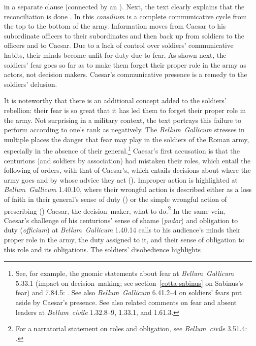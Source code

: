 \documentclass[12pt,letterpaper,oneside,final]{memoir}
\begin{document}
in a separate clause (connected by an ). Next, the text clearly explains that the reconciliation is done . In this \emph{consilium} is a complete communicative cycle from the top to the bottom of the army. Information moves from Caesar to his subordinate officers to their subordinates and then back up from soldiers to the officers and to Caesar. Due to a lack of control over soldiers' communicative habits, their minds become unfit for duty due to fear. As shown next, the soldiers' fear goes so far as to make them forget their proper role in the army as actors, not decision makers. Caesar's communicative presence is a remedy to the soldiers' delusion.

It is noteworthy that there is an additional concept added to the soldiers' rebellion: their fear is so great that it has led them to forget their proper role in the army. Not surprising in a military context, the text portrays this failure to perform according to one's rank as negatively. The \emph{Bellum~Gallicum} stresses in multiple places the danger that fear may play in the soldiers of the Roman army, especially in the absence of their general.\footnote{See, for example, the gnomic statements about fear at \emph{Bellum~Gallicum} 5.33.1 (impact on decision--making; see section~\ref{cotta-sabinus} on Sabinus's fear) and 7.84.5: . See also \emph{Bellum~Gallicum} 6.41.2--4 on soldiers' fears put aside by Caesar's presence. See also related comments on fear and absent leaders at \emph{Bellum~civile} 1.32.8--9, 1.33.1, and 1.61.3.} Caesar's first accusation is that the centurions (and soldiers by association) had mistaken their roles, which entail the following of orders, with that of Caesar's, which entails decisions about where the army goes and by whose advice they act (). Improper action is highlighted at \emph{Bellum~Gallicum} 1.40.10, where their wrongful action is described either as a loss of faith in their general's sense of duty () or the simple wrongful action of prescribing () Caesar, the decision--maker, what to do.\footnote{\label{aliae-partes}For a narratorial statement on roles and obligation, see \emph{Bellum~civile} 3.51.4: .} In the same vein, Caesar's challenge of his centurions' sense of shame (\emph{pudor}) and obligation to duty (\emph{officium}) at \emph{Bellum~Gallicum} 1.40.14 calls to his audience's minds their proper role in the army, the duty assigned to it, and their sense of obligation to this role and its obligations. The soldiers' disobedience highlights 
\end{document}
